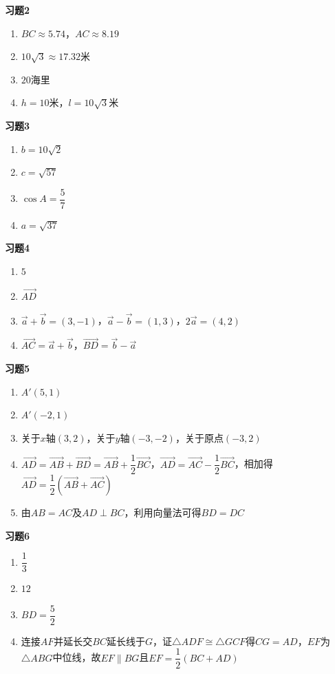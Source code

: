 \documentclass[a4paper,12pt]{ctexart}
\begin{document}
\textbf{习题2}
\begin{enumerate}
\item $BC\approx5.74$，$AC\approx8.19$
\item $10\sqrt3\approx17.32$米
\item $20$海里
\item $h=10$米，$l=10\sqrt3$米
\end{enumerate}

\textbf{习题3}
\begin{enumerate}
\item $b=10\sqrt2$
\item $c=\sqrt{57}$
\item $\cos A=\dfrac57$
\item $a=\sqrt{37}$
\end{enumerate}

\textbf{习题4}
\begin{enumerate}
\item $5$
\item $\overrightarrow{AD}$
\item $\vec a+\vec b=(3,-1)$，$\vec a-\vec b=(1,3)$，$2\vec a=(4,2)$
\item $\overrightarrow{AC}=\vec a+\vec b$，$\overrightarrow{BD}=\vec b-\vec a$
\end{enumerate}

\textbf{习题5}
\begin{enumerate}
\item $A'(5,1)$
\item $A'(-2,1)$
\item 关于$x$轴$(3,2)$，关于$y$轴$(-3,-2)$，关于原点$(-3,2)$
\item $\overrightarrow{AD}=\overrightarrow{AB}+\overrightarrow{BD}=\overrightarrow{AB}+\dfrac12\overrightarrow{BC}$，$\overrightarrow{AD}=\overrightarrow{AC}-\dfrac12\overrightarrow{BC}$，相加得$\overrightarrow{AD}=\dfrac12(\overrightarrow{AB}+\overrightarrow{AC})$
\item 由$AB=AC$及$AD\perp BC$，利用向量法可得$BD=DC$
\end{enumerate}

\textbf{习题6}
\begin{enumerate}
\item $\dfrac13$
\item $12$
\item $BD=\dfrac52$
\item 连接$AF$并延长交$BC$延长线于$G$，证$\triangle ADF\cong\triangle GCF$得$CG=AD$，$EF$为$\triangle ABG$中位线，故$EF\parallel BG$且$EF=\dfrac12(BC+AD)$
\end{enumerate}
\end{document}

